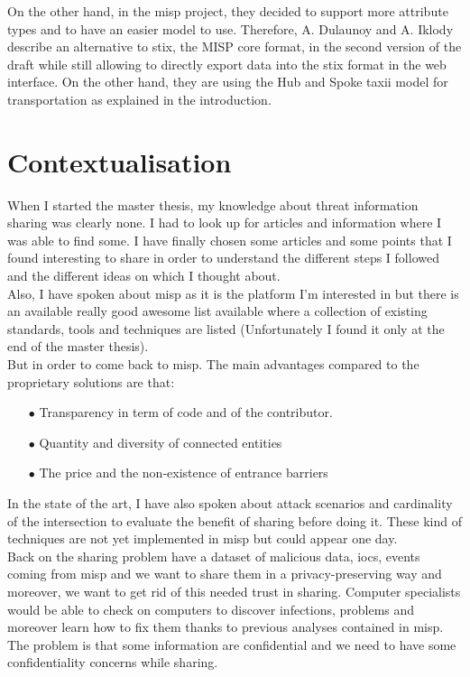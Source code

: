 \documentclass{eplmastersthesis}
\begin{document}
On the other hand, in the \gls{misp} project, they decided to support more attribute types and to have an easier model to use. Therefore, A. Dulaunoy and A. Iklody describe an alternative to \gls{stix}, the MISP core format, in the second version of the draft\cite{MispDraft} while still allowing to directly export data into the \gls{stix} format in the web interface. On the other hand, they are using the Hub and Spoke \gls{taxii} model for transportation as explained in the introduction.

\section{Contextualisation}
When I started the master thesis, my knowledge about threat information sharing was clearly none. I had to look up for articles and information where I was able to find some. I have finally chosen some articles and some points that I found interesting to share in order to understand the different steps I followed and the different ideas on which I thought about.\\
Also, I have spoken about \gls{misp} as it is the platform I'm interested in but there is an available really good awesome list \cite{AwesomeTreat} available where a collection of existing standards, tools and techniques are listed (Unfortunately I found it only at the end of the master thesis).\\
But in order to come back to \gls{misp}. The main advantages compared to the proprietary solutions are that:
\begin{itemize}
\item[$\bullet$] Transparency in term of code and of the contributor.
\item[$\bullet$] Quantity and diversity of connected entities
\item[$\bullet$] The price and the non-existence of entrance barriers
\end{itemize}

In the state of the art, I have also spoken about attack scenarios and cardinality of the intersection to evaluate the benefit of sharing before doing it. These kind of techniques are not yet implemented in \gls{misp} but could appear one day.\\

Back on the sharing problem have a dataset of malicious data, \gls{ioc}s, events coming from \gls{misp} and we want to share them in a privacy-preserving way and moreover, we want to get rid of this needed trust in sharing.
Computer specialists would be able to check on computers to discover infections, problems and moreover learn how to fix them thanks to previous analyses contained in \gls{misp}. The problem is that some information are confidential and we need to have some confidentiality concerns while sharing. \\
\end{document}
